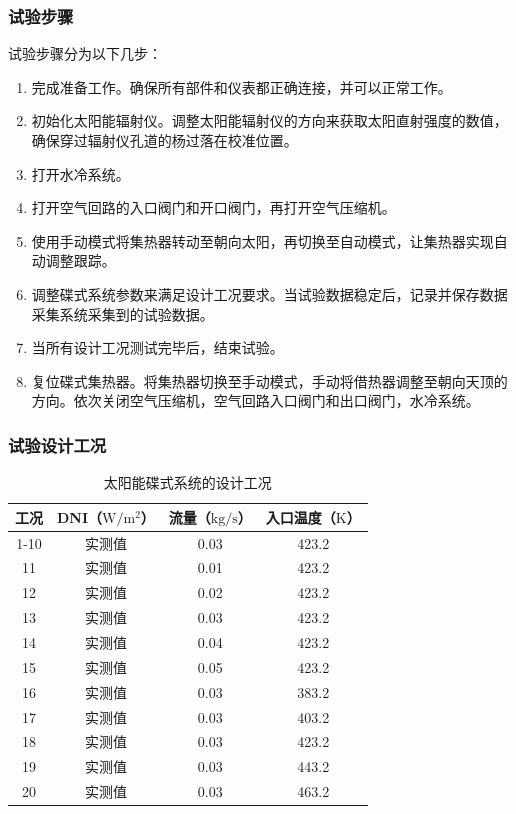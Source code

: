 \subsubsection{试验步骤}
试验步骤分为以下几步：
\begin{enumerate}[label=(\arabic*)]
	\item 完成准备工作。确保所有部件和仪表都正确连接，并可以正常工作。
	\item 初始化太阳能辐射仪。调整太阳能辐射仪的方向来获取太阳直射强度的数值，确保穿过辐射仪孔道的杨过落在校准位置。
	\item 打开水冷系统。
	\item 打开空气回路的入口阀门和开口阀门，再打开空气压缩机。
	\item 使用手动模式将集热器转动至朝向太阳，再切换至自动模式，让集热器实现自动调整跟踪。
	\item 调整碟式系统参数来满足设计工况要求。当试验数据稳定后，记录并保存数据采集系统采集到的试验数据。
	\item 当所有设计工况测试完毕后，结束试验。 
	\item 复位碟式集热器。将集热器切换至手动模式，手动将借热器调整至朝向天顶的方向。依次关闭空气压缩机，空气回路入口阀门和出口阀门，水冷系统。
\end{enumerate}

\subsubsection{试验设计工况}

\begin{table}[htbp]\footnotesize
	\caption{太阳能碟式系统的设计工况}
	\begin{center}
	\begin{tabular}{cccc}
		\toprule
		工况	& DNI（$\mathrm{W/m^2}$）	&	流量（$\mathrm{kg/s}$）			&	入口温度（$\mathrm{K}$）\\
		\midrule
		1-10	&	实测值	&	0.03	&	423.2\\
		11	&	实测值	&	0.01	&	423.2\\
		12	&	实测值	&	0.02	&	423.2\\
		13	&	实测值	&	0.03	&	423.2\\
		14	&	实测值	&	0.04	&	423.2\\
		15	&	实测值	&	0.05	&	423.2\\
		16	&	实测值	&	0.03	&	383.2\\
		17	&	实测值	&	0.03	&	403.2\\
		18	&	实测值	&	0.03	&	423.2\\
		19	&	实测值	&	0.03	&	443.2\\
		20	&	实测值	&	0.03	&	463.2\\
		\bottomrule
	\end{tabular}
	\end{center}
	\label{tab:DesignedCasesForDish}
\end{table}

